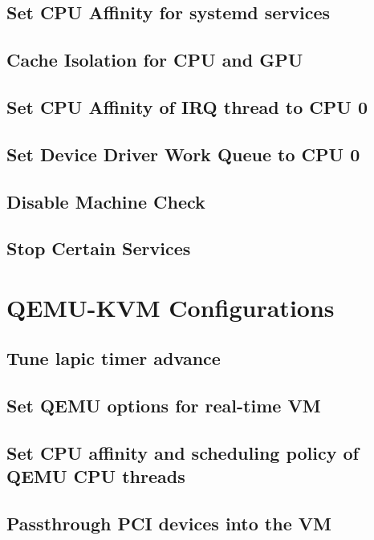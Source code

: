 \documentclass[MMR,Master,english]{twbook}
\begin{document}
\subsection{Set CPU Affinity for systemd services}
\subsection{Cache Isolation for CPU and GPU}
\subsection{Set CPU Affinity of IRQ thread to CPU 0}
\subsection{Set Device Driver Work Queue to CPU 0}
\subsection{Disable Machine Check}
\subsection{Stop Certain Services}
\section{QEMU-KVM Configurations}
\subsection{Tune lapic timer advance}
\subsection{Set QEMU options for real-time VM}
\subsection{Set CPU affinity and scheduling policy of QEMU CPU threads}
\subsection{Passthrough PCI devices into the VM}

\clearpage
\end{document}
